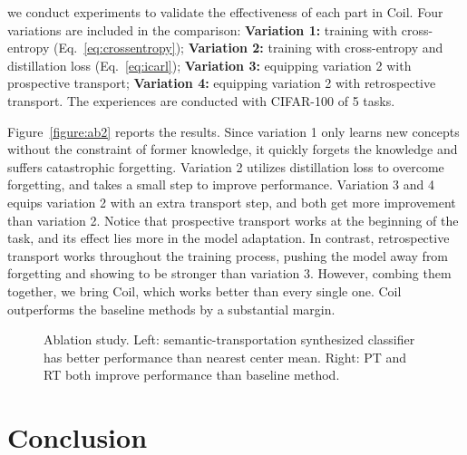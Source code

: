 \documentclass[sigconf]{acmart}
\newcommand{\name}{{\sc Coil }}
\newcommand{\mame}{{\sc Coil}}
\begin{document}
  we conduct experiments to validate the effectiveness of each part in \mame. Four variations are included in the comparison: {\bf Variation 1:} training with cross-entropy (Eq.~\ref{eq:crossentropy}); {\bf Variation 2:} training with cross-entropy and distillation loss (Eq.~\ref{eq:icarl}); {\bf Variation 3:} equipping variation 2 with prospective transport; {\bf Variation 4:} equipping variation 2 with retrospective transport. The experiences are conducted with CIFAR-100 of 5 tasks.

Figure~\ref{figure:ab2} reports the results. Since variation 1 only learns new concepts without the constraint of former knowledge, it quickly forgets the knowledge and suffers catastrophic forgetting. Variation 2 utilizes distillation loss to overcome forgetting, and takes a small step to improve performance. Variation 3 and 4 equips variation 2 with an extra transport step, and both get more improvement than variation 2. Notice that prospective transport works at the beginning of the task, and its effect lies more in the model adaptation. In contrast, retrospective transport works throughout the training process, pushing the model away from forgetting and showing to be stronger than variation 3. However, combing them together, we bring \mame, which works better than every single one. \name outperforms the baseline methods by a substantial margin.

\begin{figure}[t]
	\begin{center}
	\end{center}
	\vspace{-3mm}
	\caption{\small Ablation study. Left: semantic-transportation synthesized classifier has better performance than nearest center mean.
		Right:	PT and RT both improve performance than baseline method.} \label{figure:abalation}
	\vspace{-3mm}
\end{figure}


\section{Conclusion}
\end{document}
